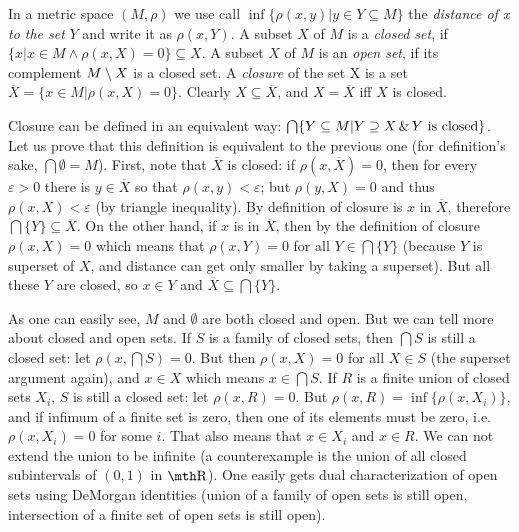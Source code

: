 \bigskip

 In a metric space $(M,\rho)$ we use call $\inf\{
\rho(x,y)|y\in Y\subseteq M\}$ the {\it distance of x to the set} $Y$ and write 
it as $\rho(x,Y)$. A subset $X$ of $M$ is a {\it closed set}, if $\{x|x\in M 
\wedge \rho(x,X) = 0\}\subseteq X$. A subset $X$ of $M$ is an {\it open set}, if 
its complement $M\setminus X$ is a closed set. A {\it closure} of the set X is a 
set $\overline X = \{ x\in M|\rho(x,X)=0\}$. Clearly $X\subseteq \overline X$, 
and $X = \overline X$ iff $X$ is closed.

\medskip

Closure can be defined in an equivalent way: $\bigcap\{ Y
\subseteq M| Y\supseteq X \,\&\,  Y\hbox{ is closed}\}$. Let us prove that this
definition is equivalent to the previous one (for definition's sake, $\bigcap 
\emptyset = M$). First, note that $\overline X$ is closed: if $\rho(x,\overline 
X) = 0$, then for every $\varepsilon > 0$ there is $y\in \overline X$ so that
$\rho(x,y) < \varepsilon$; but $\rho(y,X) = 0$ and thus $\rho(x,X) <
\varepsilon$ (by triangle inequality). By definition of closure is $x$ in
$\overline X$, therefore $\bigcap\{Y\}
\subseteq \overline X$. On the other hand, if $x$ is in $\overline X$, then 
by the definition of closure $\rho(x,X) = 0$ which means that $\rho(x,Y) = 0$ 
for all $Y\in \bigcap\{Y\}$ (because $Y$ is superset of $X$, and distance can 
get only smaller by taking a superset). But all these $Y$ are closed, so $x\in 
Y$ and $\overline X \subseteq \bigcap \{Y\}$.

\medskip

As one can easily see, $M$ and $\emptyset$ are both closed and open. But we 
can tell more about closed and open sets. If $S$ is a family of closed sets,
then $\bigcap S$ is still a closed set: let $\rho(x,\bigcap S)=0$. But then 
$\rho(x,X) = 0$ for all $X\in S$ (the superset argument again), and $x \in 
X$ which means $x\in \bigcap S$. If $R$ is a finite union of closed sets 
$X_i$, $S$ is still a closed set: let $\rho(x,R)=0$. But $\rho(x,R) = 
\inf\{ \rho(x,X_i) \}$, and if infimum of a finite set is zero, then one 
of its elements must be zero, i.e. $\rho(x,X_i) = 0$ for some $i$. That 
also means that $x\in X_i$ and $x\in R$. We can not extend the union to be 
infinite (a counterexample is the union of all closed subintervals of 
$(0,1)$ in $\R$). One easily gets dual characterization of open sets 
using DeMorgan identities (union of a family of open sets is still open, 
intersection of a finite set of open sets is still open).

